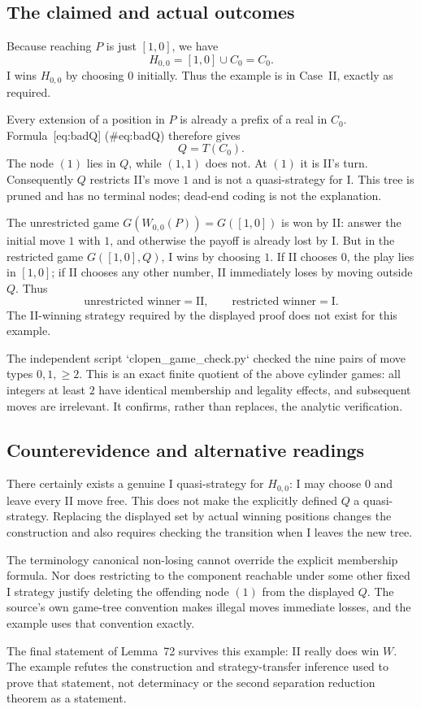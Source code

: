 \documentclass[10pt]{article}
\begin{document}
\subsection*{The claimed and actual outcomes}
Because reaching \(P\) is just \([1,0]\), we have \[H_{0,0}=[1,0]\cup C_0=C_0.\] I wins \(H_{0,0}\) by choosing \(0\) initially. Thus the example is in Case II, exactly as required.\par
Every extension of a position in \(P\) is already a prefix of a real in \(C_0\). Formula [eq:badQ] (\#eq:badQ) therefore gives \[Q=T(C_0).\] The node \((1)\) lies in \(Q\), while \((1,1)\) does not. At \((1)\) it is II’s turn. Consequently \(Q\) restricts II’s move \(1\) and is not a quasi-strategy for I. This tree is pruned and has no terminal nodes; dead-end coding is not the explanation.\par
The unrestricted game \(G(W_{0,0}(P))=G([1,0])\) is won by II: answer the initial move \(1\) with \(1\), and otherwise the payoff is already lost by I. But in the restricted game \(G([1,0],Q)\), I wins by choosing \(1\). If II chooses \(0\), the play lies in \([1,0]\); if II chooses any other number, II immediately loses by moving outside \(Q\). Thus \[\text{unrestricted winner}=\mathrm{II},\qquad
 \text{restricted winner}=\mathrm{I}.\] The II-winning strategy required by the displayed proof does not exist for this example.\par
The independent script `clopen\_game\_check.py` checked the nine pairs of move types \(0,1,\geq2\). This is an exact finite quotient of the above cylinder games: all integers at least \(2\) have identical membership and legality effects, and subsequent moves are irrelevant. It confirms, rather than replaces, the analytic verification.\par
\subsection*{Counterevidence and alternative readings}
There certainly exists a genuine I quasi-strategy for \(H_{0,0}\): I may choose \(0\) and leave every II move free. This does not make the explicitly defined \(Q\) a quasi-strategy. Replacing the displayed set by actual winning positions changes the construction and also requires checking the transition when I leaves the new tree.\par
The terminology canonical non-losing cannot override the explicit membership formula. Nor does restricting to the component reachable under some other fixed I strategy justify deleting the offending node \((1)\) from the displayed \(Q\). The source’s own game-tree convention makes illegal moves immediate losses, and the example uses that convention exactly.\par
The final statement of Lemma 72 survives this example: II really does win \(W\). The example refutes the construction and strategy-transfer inference used to prove that statement, not determinacy or the second separation reduction theorem as a statement.\par
\end{document}
